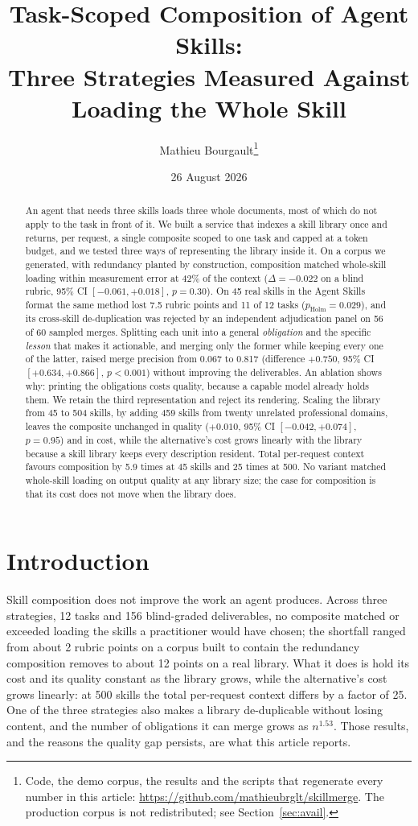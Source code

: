 \documentclass[11pt]{article}
\title{\vspace{-1.6em}\textbf{Task-Scoped Composition of Agent Skills:\\ Three Strategies Measured Against Loading the Whole Skill}\vspace{-0.3em}}
\author{Mathieu Bourgault\thanks{Code, the demo corpus, the results and the scripts that
regenerate every number in this article: \url{https://github.com/mathieubrglt/skillmerge}. The
production corpus is not redistributed; see Section~\ref{sec:avail}.}}
\date{26 August 2026}
\begin{document}
\maketitle

\begin{abstract}
\noindent An agent that needs three skills loads three whole documents, most of which do not apply
to the task in front of it. We built a service that indexes a skill library once and returns, per
request, a single composite scoped to one task and capped at a token budget, and we tested three
ways of representing the library inside it. On a corpus we generated, with redundancy planted by
construction, composition matched whole-skill loading within measurement error at 42\% of the
context ($\Delta = -0.022$ on a blind rubric, 95\% CI $[-0.061, +0.018]$, $p = 0.30$). On 45 real
skills in the Agent Skills format the same method lost 7.5 rubric points and 11 of 12 tasks
($p_{\text{Holm}} = 0.029$), and its cross-skill de-duplication was rejected by an independent
adjudication panel on 56 of 60 sampled merges. Splitting each unit into a general \emph{obligation}
and the specific \emph{lesson} that makes it actionable, and merging only the former while keeping
every one of the latter, raised merge precision from 0.067 to 0.817 (difference $+0.750$, 95\% CI
$[+0.634, +0.866]$, $p < 0.001$) without improving the deliverables. An ablation shows why: printing
the obligations costs quality, because a capable model already holds them. We retain the third
representation and reject its rendering.
Scaling the library from 45 to 504 skills, by adding 459 skills from twenty unrelated professional
domains, leaves the composite unchanged in quality ($+0.010$, 95\% CI $[-0.042, +0.074]$,
$p = 0.95$) and in cost, while the alternative's cost grows linearly with the library because a
skill library keeps every description resident. Total per-request context favours composition by
5.9 times at 45 skills and 25 times at 500. No variant matched whole-skill loading on output
quality at any library size; the case for composition is that its cost does not move when the
library does.
\end{abstract}

\section{Introduction}

Skill composition does not improve the work an agent produces. Across three strategies, 12 tasks
and 156 blind-graded deliverables, no composite matched or exceeded loading the skills a
practitioner would have chosen; the shortfall ranged from about 2 rubric points on a corpus built
to contain the redundancy composition removes to about 12 points on a real library. What it does
is hold its cost and its quality constant as the
library grows, while the alternative's cost grows linearly: at 500 skills the total per-request
context differs by a factor of 25. One of the three strategies also makes a library de-duplicable
without losing content, and the number of obligations it can merge grows as $n^{1.53}$. Those
results, and the reasons the quality gap persists, are what this article reports.
\end{document}
